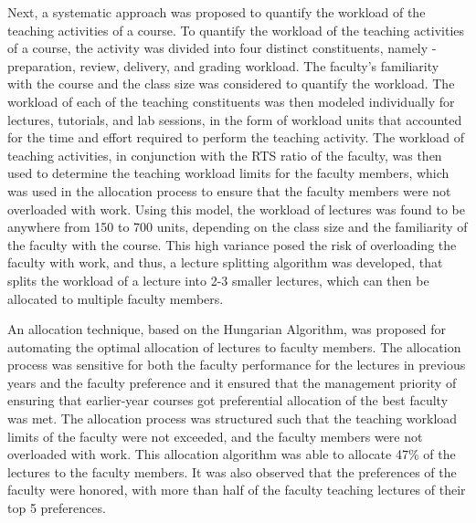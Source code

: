 Next, a systematic approach was proposed to quantify the workload of the teaching activities of a course. To quantify the workload of the teaching activities of a course, the activity was divided into four distinct constituents, namely - preparation, review, delivery, and grading workload. The faculty’s familiarity with the course and the class size was considered to quantify the workload. The workload of each of the teaching constituents was then modeled individually for lectures, tutorials, and lab sessions, in the form of workload units that accounted for the time and effort required to perform the teaching activity. The workload of teaching activities, in conjunction with the RTS ratio of the faculty, was then used to determine the teaching workload limits for the faculty members, which was used in the allocation process to ensure that the faculty members were not overloaded with work. Using this model, the workload of lectures was found to be anywhere from 150 to 700 units, depending on the class size and the familiarity of the faculty with the course. This high variance posed the risk of overloading the faculty with work, and thus, a lecture splitting algorithm was developed, that splits the workload of a lecture into 2-3 smaller lectures, which can then be allocated to multiple faculty members.

An allocation technique, based on the Hungarian Algorithm, was proposed for automating the optimal allocation of lectures to faculty members. The allocation process was sensitive for both the faculty performance for the lectures in previous years and the faculty preference and it ensured that the management priority of ensuring that earlier-year courses got preferential allocation of the best faculty was met. The allocation process was structured such that the teaching workload limits of the faculty were not exceeded, and the faculty members were not overloaded with work. This allocation algorithm was able to allocate 47\% of the lectures to the faculty members. It was also observed that the preferences of the faculty were honored, with more than half of the faculty teaching lectures of their top 5 preferences.

